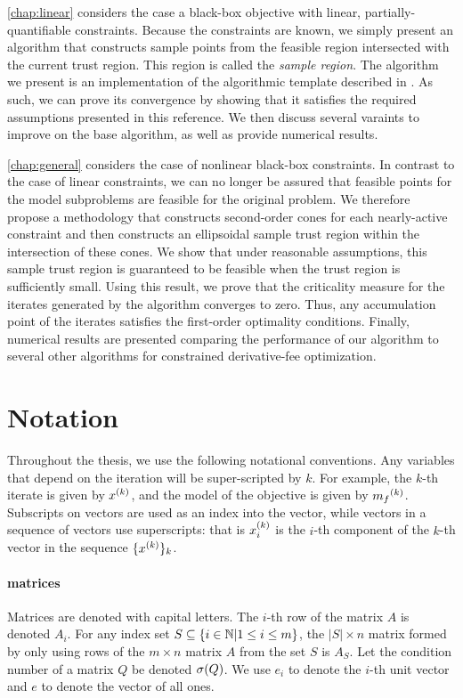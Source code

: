 \cref{chap:linear} considers the case a black-box objective with linear,  partially-quantifiable constraints.
Because the constraints are known, we simply present an algorithm that constructs sample points from the feasible region intersected with the current trust region.
This region is called the {\em sample region}.
The algorithm we present is an implementation of the algorithmic template described in \cite{Conejo:2013:GCT:2620806.2621814}.
As such, we can prove its convergence by showing that it satisfies the required assumptions presented in this reference.
We then discuss several varaints to improve on the base algorithm, as well as provide numerical results.

\cref{chap:general} considers the case of nonlinear black-box constraints.
In contrast to the case of linear constraints, we can no longer be assured that feasible points for the model subproblems are feasible for the original problem.
We therefore propose a methodology that constructs second-order cones for each nearly-active constraint and then constructs an ellipsoidal sample trust region within the intersection of these cones.
We show that under reasonable assumptions, this sample trust region is guaranteed to be feasible when the trust region is sufficiently small.
Using this result,  we prove that the criticality measure for the iterates generated by the algorithm converges to zero.
Thus,  any accumulation point of the iterates satisfies the first-order optimality conditions.
Finally, numerical results are presented comparing the performance of our algorithm to several other algorithms for constrained derivative-fee optimization.

\section{Notation}  Throughout the thesis, we use the following notational conventions.
Any variables that depend on the iteration will be super-scripted by $k$.
For example, the $k$-th iterate is given by $x^{(k)}$, and the model of the objective is given by ${{m}_f}^{(k)}$.
Subscripts on vectors are used as an index into the vector, while vectors in a sequence of vectors use superscripts:
that is $x_i^{(k)}$ is the $i$-th component of the $k$-th vector in the sequence $\{x^{(k)}\}_k$.

\paragraph*{matrices}
Matrices are denoted with capital letters.
The $i$-th row of the matrix $A$ is denoted $A_i$.
For any index set $S \subseteq \{i \in \mathbb N | 1 \le i \le m\}$, the $|S| \times n$ matrix formed by only using
rows of the $m\times n$ matrix $A$ from the set $S$ is $A_S$.
Let the condition number of a matrix $Q$ be denoted ${\sigma}(Q)$.
We use $e_i$ to denote the $i$-th unit vector and $e$ to denote the vector of all ones.

